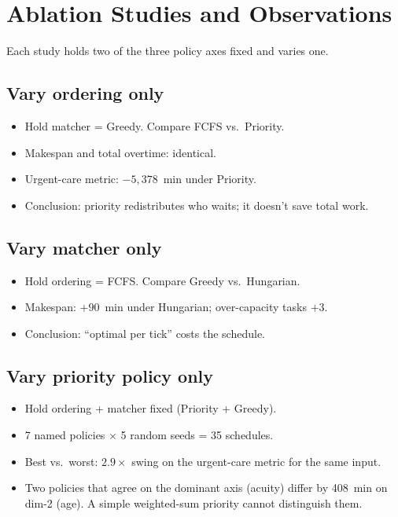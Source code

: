 \section{Ablation Studies and Observations}
\label{sec:ablation}

Each study holds two of the three policy axes fixed and varies one.

\subsection{Vary ordering only}

\begin{itemize}
  \item Hold matcher = Greedy. Compare FCFS vs.\ Priority.
  \item Makespan and total overtime: identical.
  \item Urgent-care metric: $-5{,}378$~min under Priority.
  \item Conclusion: priority redistributes who waits; it doesn't
        save total work.
\end{itemize}

\subsection{Vary matcher only}

\begin{itemize}
  \item Hold ordering = FCFS. Compare Greedy vs.\ Hungarian.
  \item Makespan: $+90$~min under Hungarian; over-capacity tasks
        $+3$.
  \item Conclusion: ``optimal per tick'' costs the schedule.
\end{itemize}

\subsection{Vary priority policy only}

\begin{itemize}
  \item Hold ordering + matcher fixed (Priority + Greedy).
  \item 7 named policies $\times$ 5 random seeds = 35 schedules.
  \item Best vs.\ worst: $2.9\times$ swing on the urgent-care
        metric for the same input.
  \item Two policies that agree on the dominant axis (acuity)
        differ by 408~min on dim-2 (age). A simple weighted-sum
        priority cannot distinguish them.
\end{itemize}

